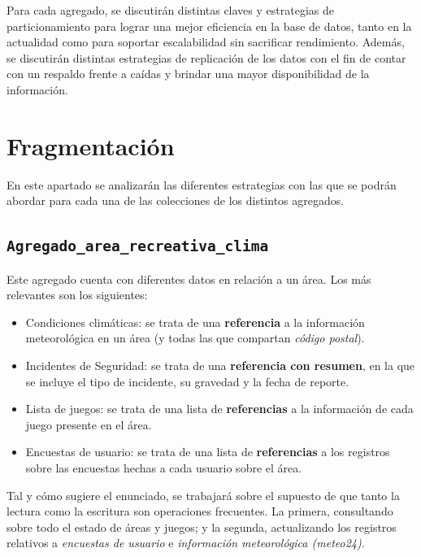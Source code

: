 \documentclass[]{article}
\begin{document}
Para cada agregado, se discutirán distintas claves y estrategias de particionamiento para lograr una mejor eficiencia en la base de datos, tanto en la actualidad como para soportar escalabilidad sin sacrificar rendimiento. Además, se discutirán distintas estrategias de replicación de los datos con el fin de contar con un respaldo frente a caídas y brindar una mayor disponibilidad de la información.


\section{Fragmentación}
\label{sec:fragmentacion}
En este apartado se analizarán las diferentes estrategias con las que se podrán abordar para cada una de las colecciones de los distintos agregados.

\subsection{\texttt{Agregado\_area\_recreativa\_clima}}
\label{subec:areas}
Este agregado cuenta con diferentes datos en relación a un área. Los más relevantes son los siguientes:
\begin{itemize}
    \item Condiciones climáticas: se trata de una \textbf{referencia} a la información meteorológica en un área (y todas las que compartan \textit{código postal}).
    \item Incidentes de Seguridad: se trata de una \textbf{referencia con resumen}, en la que se incluye el tipo de incidente, su gravedad y la fecha de reporte.
    \item Lista de juegos: se trata de una lista de \textbf{referencias} a la información de cada juego presente en el área.
    \item Encuestas de usuario: se trata de una lista de \textbf{referencias} a los registros sobre las encuestas hechas a cada usuario sobre el área.
\end{itemize}

Tal y cómo sugiere el enunciado, se trabajará sobre el supuesto de que tanto la lectura como la escritura son operaciones frecuentes. La primera, consultando sobre todo el estado de áreas y juegos; y la segunda, actualizando los registros relativos a \textit{encuestas de usuario} e \textit{información meteorológica (meteo24)}.
\end{document}

